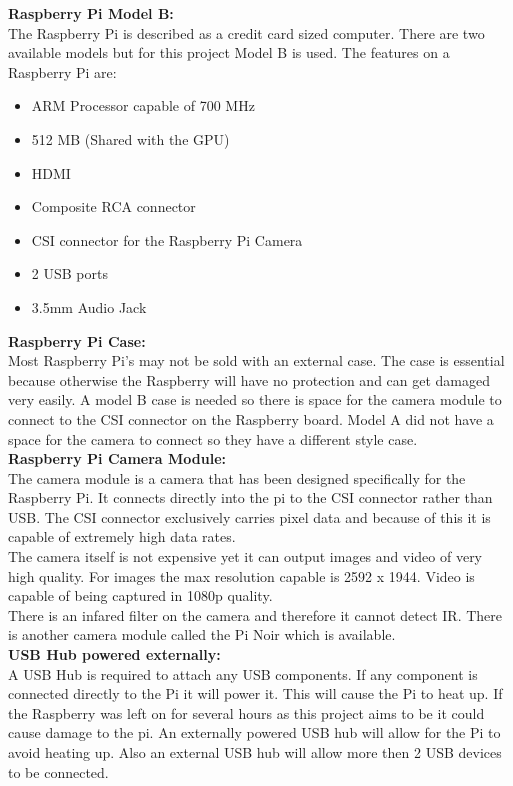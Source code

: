 \documentclass[]{report}   %
\begin{document}
{\bf Raspberry Pi Model B:} \\
The Raspberry Pi is described as a credit card sized computer. There are two available models but for this project Model B is used. The features on a Raspberry Pi are:
\begin {itemize}
  \item ARM Processor capable of 700 MHz
  \item 512 MB (Shared with the GPU)
  \item HDMI
  \item Composite RCA connector
  \item CSI connector for the Raspberry Pi Camera
  \item 2 USB ports
  \item 3.5mm Audio Jack\\
\end {itemize}

{\bf Raspberry Pi Case:} \\ 
Most Raspberry Pi's may not be sold with an external case. The case is essential because otherwise the Raspberry will have no protection and can get damaged very easily. A model B case is needed so there is space for the camera module to connect to the CSI connector on the Raspberry board. Model A did not have a space for the camera to connect so they have a different style case.\\

{\bf Raspberry Pi Camera Module:} \\
The camera module is a camera that has been designed specifically for the Raspberry Pi. It connects directly into the pi to the CSI connector rather than USB. The CSI connector exclusively carries pixel data and because of this it is capable of extremely high data rates.\\

The camera itself is not expensive yet it can output images and video of very high quality. For images the max resolution capable is 2592 x 1944. Video is capable of being captured in 1080p quality.\\

There is an infared filter on the camera and therefore it cannot detect IR. There is another camera module called the Pi Noir which is available.\\ 

{\bf USB Hub powered externally:}\\

A USB Hub is required to attach any USB components. If any component is connected directly to the Pi it will power it. This will cause the Pi to heat up. If the Raspberry was left on for several hours as this project aims to be it could cause damage to the pi. An externally powered USB hub will allow for the Pi to avoid heating up. Also an external USB hub will allow more then 2 USB devices to be connected.
\end{document}
